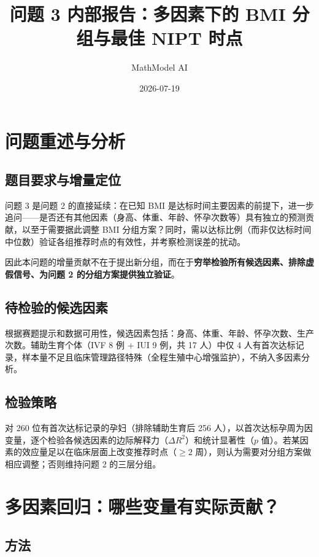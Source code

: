 \documentclass{internal-report}
\title{问题 3 内部报告：多因素下的 BMI 分组与最佳 NIPT 时点}
\author{MathModel AI}
\date{2026-07-19}
\begin{document}
\maketitle

\section{问题重述与分析}

\subsection{题目要求与增量定位}

问题 3 是问题 2 的直接延续：在已知 BMI 是达标时间主要因素的前提下，进一步追问——是否还有其他因素（身高、体重、年龄、怀孕次数等）具有独立的预测贡献，以至于需要据此调整 BMI 分组方案？同时，需以达标比例（而非仅达标时间中位数）验证各组推荐时点的有效性，并考察检测误差的扰动。

因此本问题的增量贡献不在于提出新分组，而在于\textbf{穷举检验所有候选因素、排除虚假信号、为问题 2 的分组方案提供独立验证}。

\subsection{待检验的候选因素}

根据赛题提示和数据可用性，候选因素包括：身高、体重、年龄、怀孕次数、生产次数。辅助生育个体（IVF 8 例 + IUI 9 例，共 17 人）中仅 4 人有首次达标记录，样本量不足且临床管理路径特殊（全程生殖中心增强监护），不纳入多因素分析。

\subsection{检验策略}

对 260 位有首次达标记录的孕妇（排除辅助生育后 256 人），以首次达标孕周为因变量，逐个检验各候选因素的边际解释力（$\Delta R^2$）和统计显著性（$p$ 值）。若某因素的效应量足以在临床层面上改变推荐时点（$\geq 2$ 周），则认为需要对分组方案做相应调整；否则维持问题 2 的三层分组。

\section{多因素回归：哪些变量有实际贡献？}

\subsection{方法}
\end{document}

